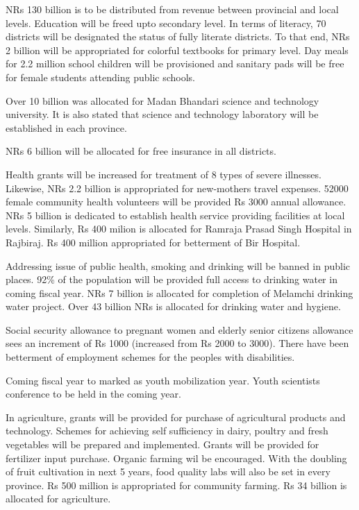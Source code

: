 \documentclass[
  openany]{book}
\begin{document}
NRs 130 billion is to be distributed from revenue between provincial and local levels. Education will be freed upto secondary level. In terms of literacy, 70 districts will be designated the status of fully literate districts. To that end, NRs 2 billion will be appropriated for colorful textbooks for primary level. Day meals for 2.2 million school children will be provisioned and sanitary pads will be free for female students attending public schools.

Over 10 billion was allocated for Madan Bhandari science and technology university. It is also stated that science and technology laboratory will be established in each province.

NRs 6 billion will be allocated for free insurance in all districts.

Health grants will be increased for treatment of 8 types of severe illnesses. Likewise, NRs 2.2 billion is appropriated for new-mothers travel expenses. 52000 female community health volunteers will be provided Rs 3000 annual allowance. NRs 5 billion is dedicated to establish health service providing facilities at local levels. Similarly, Rs 400 milion is allocated for Ramraja Prasad Singh Hospital in Rajbiraj. Rs 400 million appropriated for betterment of Bir Hospital.

Addressing issue of public health, smoking and drinking will be banned in public places. 92\% of the population will be provided full access to drinking water in coming fiscal year. NRs 7 billion is allocated for completion of Melamchi drinking water project. Over 43 billion NRs is allocated for drinking water and hygiene.

Social security allowance to pregnant women and elderly senior citizens allowance sees an increment of Rs 1000 (increased from Rs 2000 to 3000). There have been betterment of employment schemes for the peoples with disabilities.

Coming fiscal year to marked as youth mobilization year. Youth scientists conference to be held in the coming year.

In agriculture, grants will be provided for purchase of agricultural products and technology. Schemes for achieving self sufficiency in dairy, poultry and fresh vegetables will be prepared and implemented. Grants will be provided for fertilizer input purchase. Organic farming wil be encouraged. With the doubling of fruit cultivation in next 5 years, food quality labs will also be set in every province. Rs 500 million is appropriated for community farming. Rs 34 billion is allocated for agriculture.
\end{document}
